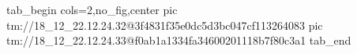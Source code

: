  
 
 
 
 

\qqSecOrig


\ifcmt
  tab_begin cols=2,no_fig,center
    pic tm://18_12_22.12.24.32@3f4831f35e0dc5d3bc047cf113264083
    pic tm://18_12_22.12.24.33@f0ab1a1334fa34600201118b7f80c3a1
  tab_end
\fi

